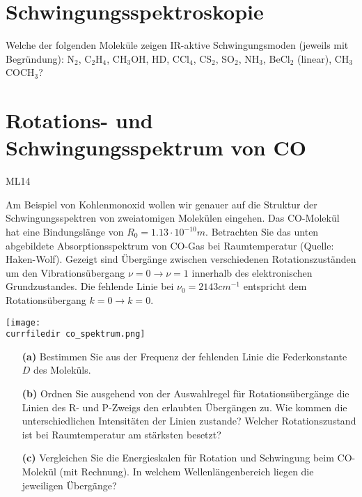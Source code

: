\section{Schwingungsspektroskopie}
\vspace{0.7cm}%

Welche der folgenden Moleküle zeigen IR-aktive Schwingungsmoden (jeweils mit Begründung): N$_2$, C$_2$H$_4$, CH$_3$OH, HD, CCl$_4$, CS$_2$, SO$_2$, NH$_3$, BeCl$_2$ (linear), CH$_3$COCH$_3$?





\section{Rotations- und Schwingungsspektrum von CO}
ML14

Am Beispiel von Kohlenmonoxid wollen wir genauer auf die Struktur der Schwingungsspektren von zweiatomigen Molekülen eingehen. Das CO-Molekül hat eine Bindungslänge von $R_0=1.13 \cdot 10^{-10} m$. Betrachten Sie das unten abgebildete Absorptionsspektrum von CO-Gas bei Raumtemperatur (Quelle: Haken-Wolf). Gezeigt sind Übergänge zwischen verschiedenen Rotationszuständen um den Vibrationsübergang $\nu=0 \rightarrow \nu=1$ innerhalb des elektronischen Grundzustandes. Die fehlende Linie bei $\nu_0=2143 cm^{-1}$ entspricht dem Rotationsübergang $k=0 \rightarrow k=0$. \\
\vspace{3mm}


  \hspace*{5mm}
      \texttt{[image: \\currfiledir co\_spektrum.png]}

\vspace*{1\baselineskip}

\begin{itemize}
 											
	\item[\textbf{(a)}] Bestimmen Sie aus der Frequenz der fehlenden Linie die Federkonstante $D$ des Moleküls. 

	\item[\textbf{(b)}] Ordnen Sie ausgehend von der Auswahlregel für Rotationsübergänge die Linien des R- und P-Zweigs den erlaubten Übergängen zu. Wie kommen die unterschiedlichen Intensitäten der Linien zustande? Welcher Rotationszustand ist bei Raumtemperatur am stärksten besetzt?
		
	\item[\textbf{(c)}] Vergleichen Sie die Energieskalen für Rotation und Schwingung beim CO-Molekül (mit Rechnung). In welchem Wellenlängenbereich liegen die jeweiligen Übergänge?

\end{itemize}




